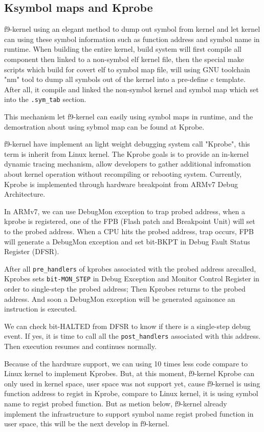 \documentclass[10pt,preprint,nocopyrightspace]{sigplanconf}
\begin{document}
\subsection{Ksymbol maps and Kprobe}
f9-kernel using an elegant method to dump out symbol from kernel and let kernel can using these symbol information such as function address and symbol name in runtime. When building the entire kernel, build system will first compile all component then linked to a non-symbol elf kernel file, then the special make scripts which build for covert elf to symbol map file, will using GNU toolchain "nm" tool to dump all symbols out of the kernel into a pre-define c template. After all, it compile and linked the non-symbol kernel and symbol map which set into the \texttt{.sym\_tab} section.

This mechanism let f9-kernel can easily using symbol maps in runtime, and the demostration about using sybmol map can be found at Kprobe.

f9-kernel have implement an light weight debugging system call "Kprobe", this term is inherit from Linux kernel. The Kprobe goals is to provide an in-kernel dynamic tracing mechanism, allow developers to gather additional infromation about kernel operation without recompiling or rebooting system. Currently, Kprobe is implemented through hardware breakpoint from ARMv7 Debug Architecture. 

In ARMv7, we can use DebugMon exception to trap probed address\cite{yiu2013definitive}, when a kprobe is registered, one of the FPB (Flash patch and Breakpoint Unit) will set to the probed address. When a CPU hits the probed address, trap occurs, FPB will generate a DebugMon exception and set bit-BKPT in Debug Fault Status Register (DFSR).

After all \texttt{pre\_handlers} of kprobes associated with the probed address arecalled, Kprobes sets \texttt{bit-MON\_STEP} in Debug Exception and Monitor Control Register in order to single-step the probed address; Then Kprobes returns to
the probed address. And soon a DebugMon exception will be generated againonce an instruction is executed.

We can check bit-HALTED from DFSR to know if there is a single-step debug event. If yes, it is time to call all the \texttt{post\_handlers} associated with this address. Then execution resumes and continues normally.

Because of the hardware support, we can using 10 times less code compare to Linux kernel to implement Kprobes. But, at this moment, f9-kernel Kprobe can only used in kernel space, user space was not support yet, cause f9-kernel is using function address to regist in Kprobe, compare to Linux kernel, it is using symbol name to regist 
probed function. But as metion below, f9-kernel already implement the infrastructure to support symbol name regist probed function in user space, this will be the next develop in f9-kernel.
\end{document}
